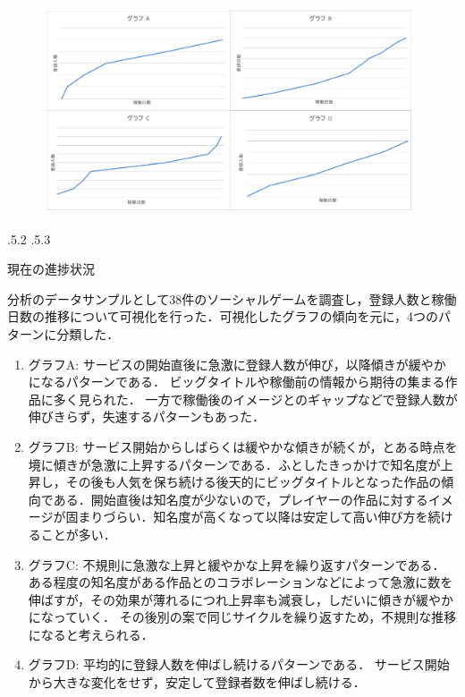 \documentclass[uplatex]{jsarticle}
\makeatletter
\renewcommand{\section}{%
    \if@slide\clearpage\fi
    \@startsection{section}{1}{\z@}%
    {\Cvs \@plus.5\Cdp \@minus.2\Cdp}%
    {.5\Cvs \@plus.3\Cdp}%
    {\normalfont\raggedright}}
\makeatother
\begin{document}
\begin{figure}
\vspace*{-\intextsep}
\includegraphics[width=11cm,clip]{g1.pdf}
\label{サンプル図}
\end{figure}


\section{現在の進捗状況}

分析のデータサンプルとして38件のソーシャルゲームを調査し，登録人数と稼働日数の推移について可視化を行った．可視化したグラフの傾向を元に，4つのパターンに分類した．


\begin{enumerate}
\item グラフA:
サービスの開始直後に急激に登録人数が伸び，以降傾きが緩やかになるパターンである．
ビッグタイトルや稼働前の情報から期待の集まる作品に多く見られた．
一方で稼働後のイメージとのギャップなどで登録人数が伸びきらず，失速するパターンもあった．

\item グラフB:
サービス開始からしばらくは緩やかな傾きが続くが，とある時点を境に傾きが急激に上昇するパターンである．ふとしたきっかけで知名度が上昇し，その後も人気を保ち続ける後天的にビッグタイトルとなった作品の傾向である．開始直後は知名度が少ないので，プレイヤーの作品に対するイメージが固まりづらい．知名度が高くなって以降は安定して高い伸び方を続けることが多い．

\item グラフC:
不規則に急激な上昇と緩やかな上昇を繰り返すパターンである．
ある程度の知名度がある作品とのコラボレーションなどによって急激に数を伸ばすが，その効果が薄れるにつれ上昇率も減衰し，しだいに傾きが緩やかになっていく．
その後別の案で同じサイクルを繰り返すため，不規則な推移になると考えられる．

\item グラフD:
平均的に登録人数を伸ばし続けるパターンである．
サービス開始から大きな変化をせず，安定して登録者数を伸ばし続ける．


\end{enumerate}
\end{document}
